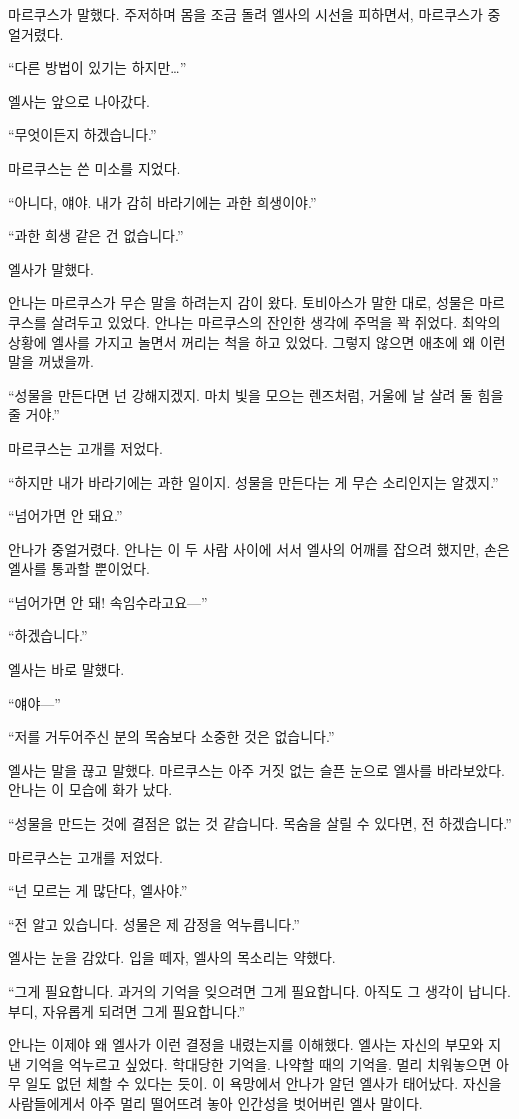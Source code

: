 마르쿠스가 말했다. 주저하며 몸을 조금 돌려 엘사의 시선을 피하면서, 마르쿠스가 중얼거렸다.

``다른 방법이 있기는 하지만\ldots''

엘사는 앞으로 나아갔다.

``무엇이든지 하겠습니다.''

마르쿠스는 쓴 미소를 지었다.

``아니다, 얘야. 내가 감히 바라기에는 과한 희생이야.''

``과한 희생 같은 건 없습니다.''

엘사가 말했다.

안나는 마르쿠스가 무슨 말을 하려는지 감이 왔다. 토비아스가 말한 대로, 성물은 마르쿠스를 살려두고 있었다. 안나는 마르쿠스의 잔인한 생각에 주먹을 꽉 쥐었다. 최악의 상황에 엘사를 가지고 놀면서 꺼리는 척을 하고 있었다. 그렇지 않으면 애초에 왜 이런 말을 꺼냈을까.

``성물을 만든다면 넌 강해지겠지. 마치 빛을 모으는 렌즈처럼, 거울에 날 살려 둘 힘을 줄 거야.''

마르쿠스는 고개를 저었다.

``하지만 내가 바라기에는 과한 일이지. 성물을 만든다는 게 무슨 소리인지는 알겠지.''

``넘어가면 안 돼요.''

안나가 중얼거렸다. 안나는 이 두 사람 사이에 서서 엘사의 어깨를 잡으려 했지만, 손은 엘사를 통과할 뿐이었다.

``넘어가면 안 돼! 속임수라고요—''

``하겠습니다.''

엘사는 바로 말했다.

``얘야—''

``저를 거두어주신 분의 목숨보다 소중한 것은 없습니다.''

엘사는 말을 끊고 말했다. 마르쿠스는 아주 거짓 없는 슬픈 눈으로 엘사를 바라보았다. 안나는 이 모습에 화가 났다.

``성물을 만드는 것에 결점은 없는 것 같습니다. 목숨을 살릴 수 있다면, 전 하겠습니다.''

마르쿠스는 고개를 저었다.

``넌 모르는 게 많단다, 엘사야.''

``전 알고 있습니다. 성물은 제 감정을 억누릅니다.''

엘사는 눈을 감았다. 입을 떼자, 엘사의 목소리는 약했다.

``그게 필요합니다. 과거의 기억을 잊으려면 그게 필요합니다. 아직도 그 생각이 납니다. 부디, 자유롭게 되려면 그게 필요합니다.''

안나는 이제야 왜 엘사가 이런 결정을 내렸는지를 이해했다. 엘사는 자신의 부모와 지낸 기억을 억누르고 싶었다. 학대당한 기억을. 나약할 때의 기억을. 멀리 치워놓으면 아무 일도 없던 체할 수 있다는 듯이. 이 욕망에서 안나가 알던 엘사가 태어났다. 자신을 사람들에게서 아주 멀리 떨어뜨려 놓아 인간성을 벗어버린 엘사 말이다.

